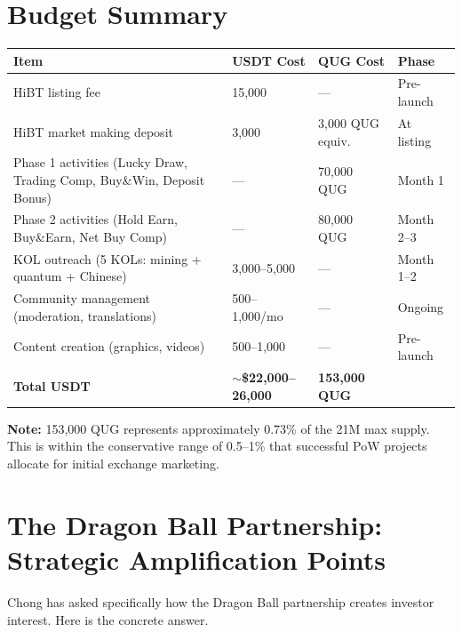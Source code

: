 \documentclass[11pt,a4paper]{article}
\begin{document}
\section{Budget Summary}

\begin{center}
\begin{tabular}{L{5.5cm} R{2.5cm} R{2.5cm} L{3cm}}
  \toprule
  \textbf{Item} & \textbf{USDT Cost} & \textbf{QUG Cost} & \textbf{Phase} \\
  \midrule
  HiBT listing fee & 15,000 & --- & Pre-launch \\
  HiBT market making deposit & 3,000 & 3,000 QUG equiv. & At listing \\
  Phase 1 activities (Lucky Draw, Trading Comp, Buy\&Win, Deposit Bonus) & --- & 70,000 QUG & Month 1 \\
  Phase 2 activities (Hold Earn, Buy\&Earn, Net Buy Comp) & --- & 80,000 QUG & Month 2--3 \\
  KOL outreach (5 KOLs: mining + quantum + Chinese) & 3,000--5,000 & --- & Month 1--2 \\
  Community management (moderation, translations) & 500--1,000/mo & --- & Ongoing \\
  Content creation (graphics, videos) & 500--1,000 & --- & Pre-launch \\
  \midrule
  \textbf{Total USDT} & \textbf{$\sim$\$22,000--26,000} & \textbf{153,000 QUG} & \\
  \bottomrule
\end{tabular}
\end{center}

\textbf{Note:} 153,000 QUG represents approximately 0.73\% of the 21M max supply. This is within the conservative range of 0.5--1\% that successful PoW projects allocate for initial exchange marketing.

\section{The Dragon Ball Partnership: Strategic Amplification Points}

Chong has asked specifically how the Dragon Ball partnership creates investor interest. Here is the concrete answer.
\end{document}
